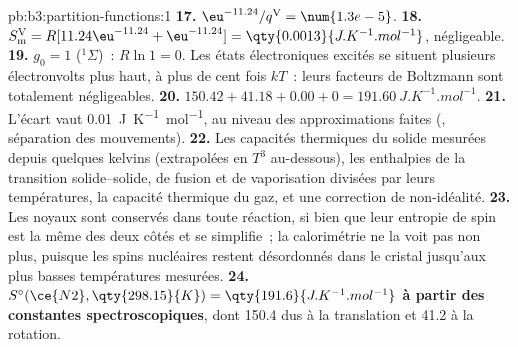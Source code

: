 \begin{solution}{pb:b3:partition-functions:1}
\textbf{17.} $\eu^{-11.24}/q^{\mathrm V} = \num{1.3e-5}$.
\textbf{18.} $S^{\mathrm V}_{\mathrm m} = R[11.24\eu^{-11.24} + \eu^{-11.24}] = \qty{0.0013}{J.K^{-1}.mol^{-1}}$,
négligeable.
\textbf{19.} $g_0 = 1$ (${}^1\Sigma$)~: $R\ln1 = 0$. Les états
électroniques excités se situent plusieurs électronvolts plus haut, à
plus de cent fois $kT$~: leurs facteurs de Boltzmann sont totalement
négligeables.
\textbf{20.} $150.42 + 41.18 + 0.00 + 0 = \qty{191.60}{J.K^{-1}.mol^{-1}}$.
\textbf{21.} L'écart vaut \qty{0.01}{J.K^{-1}.mol^{-1}}, au niveau des
approximations faites (, séparation des mouvements).
\textbf{22.} Les capacités thermiques du solide mesurées depuis quelques
kelvins (extrapolées en $T^3$ au-dessous), les enthalpies de la
transition solide--solide, de fusion et de vaporisation divisées par
leurs températures, la capacité thermique du gaz, et une correction de
non-idéalité.
\textbf{23.} Les noyaux sont conservés dans toute réaction, si bien que
leur entropie de spin est la même des deux côtés et se simplifie~; la
calorimétrie ne la voit pas non plus, puisque les spins nucléaires
restent désordonnés dans le cristal jusqu'aux plus basses températures
mesurées.
\textbf{24.} \textbf{$S^\circ(\ce{N2}, \qty{298.15}{K}) = \qty{191.6}{J.K^{-1}.mol^{-1}}$
à partir des constantes spectroscopiques}, dont 150.4 dus à la
translation et 41.2 à la rotation.
\end{solution}
